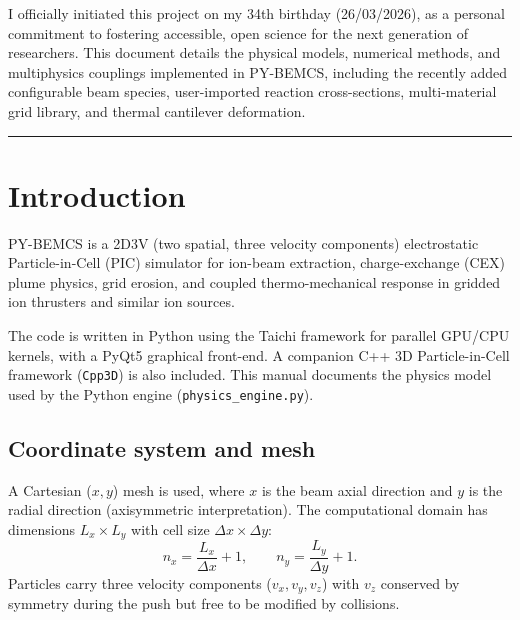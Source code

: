 \documentclass[11pt,a4paper]{article}
\newcommand{\PYBEMCS}{PY-BEMCS}
\begin{document}
I officially initiated this project on my 34th birthday
(26/03/2026), as a personal commitment to fostering accessible, open
science for the next generation of researchers.  This document details
the physical models, numerical methods, and multiphysics couplings
implemented in \PYBEMCS{}, including the recently added configurable
beam species, user-imported reaction cross-sections, multi-material
grid library, and thermal cantilever deformation.

\vspace{1em}
\hrule
\vspace{1em}

\tableofcontents
\newpage

\section{Introduction}

\PYBEMCS{} is a 2D3V (two spatial, three velocity components)
electrostatic Particle-in-Cell (PIC) simulator for ion-beam extraction,
charge-exchange (CEX) plume physics, grid erosion, and coupled
thermo-mechanical response in gridded ion thrusters and similar
ion sources.

The code is written in Python using the Taichi framework for parallel
GPU/CPU kernels, with a PyQt5 graphical front-end.  A companion C++
3D Particle-in-Cell framework (\texttt{Cpp3D}) is also included.
This manual documents the physics model used by the Python engine
(\texttt{physics\_engine.py}).

\subsection{Coordinate system and mesh}

A Cartesian (\(x,y\)) mesh is used, where \(x\) is the beam
axial direction and \(y\) is the radial direction (axisymmetric
interpretation).  The computational domain has dimensions
\(L_x \times L_y\) with cell size \(\Delta x \times \Delta y\):
\begin{equation}
    n_x = \frac{L_x}{\Delta x} + 1,\qquad
    n_y = \frac{L_y}{\Delta y} + 1.
\end{equation}
Particles carry three velocity components (\(v_x, v_y, v_z\)) with
\(v_z\) conserved by symmetry during the push but free to be modified
by collisions.

\end{document}
